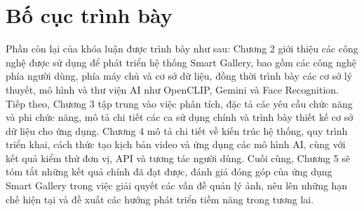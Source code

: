 



\section{Bố cục trình bày}
Phần còn lại của khóa luận được trình bày như sau: Chương 2 giới thiệu các công nghệ được sử dụng để phát triển hệ thống Smart Gallery, bao gồm các công nghệ phía người dùng, phía máy chủ và cơ sở dữ liệu, đồng thời trình bày các cơ sở lý thuyết, mô hình và thư viện AI như OpenCLIP, Gemini và Face Recognition. Tiếp theo, Chương 3 tập trung vào việc phân tích, đặc tả các yêu cầu chức năng và phi chức năng, mô tả chi tiết các ca sử dụng chính và trình bày thiết kế cơ sở dữ liệu cho ứng dụng. Chương 4 mô tả chi tiết về kiến trúc hệ thống, quy trình triển khai, cách thức tạo kịch bản video và ứng dụng các mô hình AI, cùng với kết quả kiểm thử đơn vị, API và tương tác người dùng. Cuối cùng, Chương 5 sẽ tóm tắt những kết quả chính đã đạt được, đánh giá đóng góp của ứng dụng Smart Gallery trong việc giải quyết các vấn đề quản lý ảnh, nêu lên những hạn chế hiện tại và đề xuất các hướng phát triển tiềm năng trong tương lai.